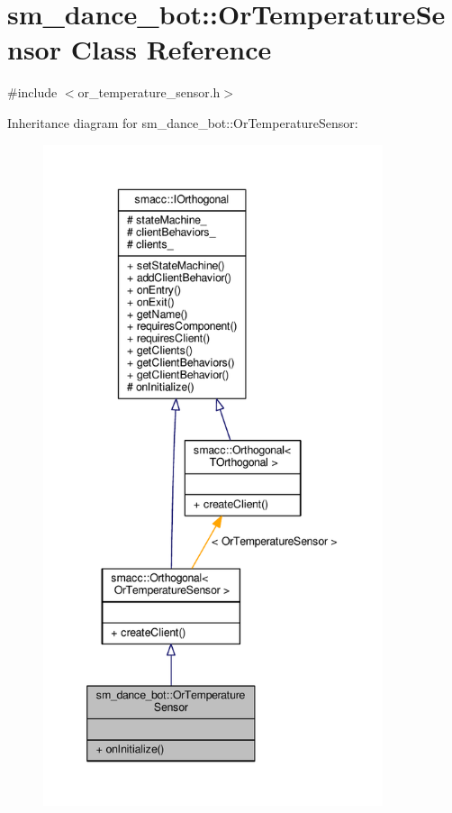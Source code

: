 \hypertarget{classsm__dance__bot_1_1OrTemperatureSensor}{}\section{sm\+\_\+dance\+\_\+bot\+:\+:Or\+Temperature\+Sensor Class Reference}
\label{classsm__dance__bot_1_1OrTemperatureSensor}


{\ttfamily \#include $<$or\+\_\+temperature\+\_\+sensor.\+h$>$}



Inheritance diagram for sm\+\_\+dance\+\_\+bot\+:\+:Or\+Temperature\+Sensor\+:\nopagebreak
\begin{figure}[H]
\begin{center}
\leavevmode
\includegraphics[height=550pt]{classsm__dance__bot_1_1OrTemperatureSensor__inherit__graph}
\end{center}
\end{figure}


